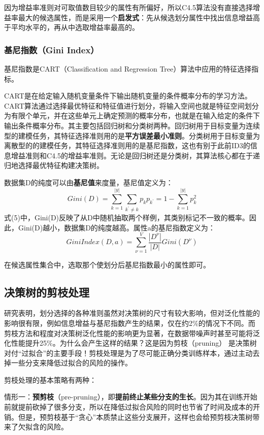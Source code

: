 因为增益率准则对可取值数目较少的属性有所偏好，所以C4.5算法没有直接选择增益率最大的候选属性，而是采用一个\textbf{启发式}：先从候选划分属性中找出信息增益高于平均水平的，再从中选取增益率最高的。
\subsubsection{\textbf{基尼指数}（Gini Index）}
基尼指数是CART（Classification and Regression Tree）算法中应用的特征选择指标。

CART是在给定输入随机变量条件下输出随机变量的条件概率分布的学习方法。CART算法通过选择最优特征和特征值进行划分，将输入空间也就是特征空间划分为有限个单元，并在这些单元上确定预测的概率分布，也就是在输入给定的条件下输出条件概率分布。其主要包括回归树和分类树两种。回归树用于目标变量为连续型的建模任务，其特征选择准则用的是\textbf{平方误差最小准则}。分类树用于目标变量为离散型的的建模任务，其特征选择准则用的是基尼指数，这也有别于此前ID3的信息增益准则和C4.5的增益率准则。无论是回归树还是分类树，其算法核心都在于递归地选择最优特征构建决策树。

数据集D的纯度可以由\textbf{基尼值}来度量，基尼值定义为：
\begin{equation}Gini(D)=\sum_{k=1}^{|y|}\sum_{k^{\prime}\neq k}p_kp_{k^{\prime}}=1-\sum_{k=1}^{|y|}p_k^2\end{equation}
式(5)中，Gini(D)反映了从D中随机抽取两个样例，其类别标记不一致的概率。因此，Gini(D)越小，数据集D的纯度越高。属性a的基尼指数定义为：
\begin{equation}GiniIndex(D,a)=\sum_{\nu=1}^V\frac{|D^\nu|}{|D|}Gini(D^\nu)\end{equation}

在候选属性集合中，选取那个使划分后基尼指数最小的属性即可。
\subsection{决策树的剪枝处理}
研究表明，划分选择的各种准则虽然对决策树的尺寸有较大影响，但对泛化性能的影响很有限，例如信息增益与基尼指数产生的结果，仅在约2\%的情况下不同。而剪枝方法和程度对决策树泛化性能的影响更为显著，在数据带噪声时甚至可能将泛化性能提升25\%。为什么会产生这样的结果？这是因为剪枝（pruning） 是决策树对付“过拟合”的主要手段！剪枝处理是为了尽可能正确分类训练样本，通过主动去掉一些分支来降低过拟合的风险的操作。

剪枝处理的基本策略有两种：

情形一：\textbf{预剪枝}（pre-pruning），即\textbf{提前终止某些分支的生长}。因为其在训练开始前就提前砍掉了很多分支，所以在降低过拟合风险的同时也节省了时间及成本的开销。但是，预剪枝基于“贪心”本质禁止这些分支展开，这样也会给预剪枝决策树带来了欠拟含的风险。


